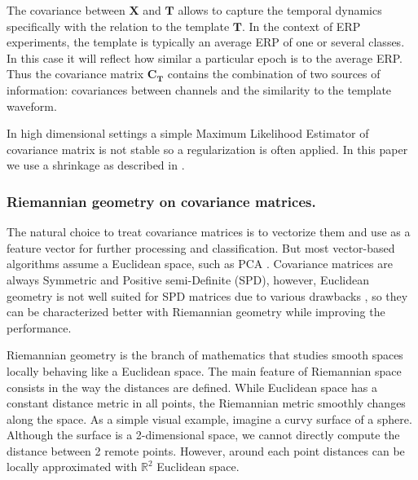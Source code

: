 \documentclass[12pt]{iopart}
\begin{document}
The covariance between $\mathbf{X}$ and $\mathbf{T}$ allows to capture the temporal dynamics
specifically with the relation to the template $\mathbf{T}$. In the context of ERP
experiments, the template is typically an average ERP of one or several classes.
In this case it will reflect how similar a particular epoch is to the average ERP.
Thus the covariance matrix $\mathbf{C}_\mathbf{T}$ contains the combination
of two sources of information: covariances between channels and the similarity to the template waveform.

In high dimensional settings a simple Maximum Likelihood Estimator of covariance matrix is not
stable so a regularization is often applied. In this paper we use
a shrinkage as described in \cite{chen_shrinkage_2010}.

\subsubsection{Riemannian geometry on covariance matrices.}
The natural choice to treat covariance matrices is to vectorize them
and use as a feature vector for further processing and classification.
But most vector-based algorithms assume a Euclidean space, such as PCA \cite{hyvarinen_independent_2001}.
Covariance matrices are always
Symmetric and Positive semi-Definite (SPD), however,
Euclidean geometry is not well suited for SPD matrices due to various
drawbacks \cite{arsigny_geometric_2007}, so they can be characterized 
better with Riemannian geometry while improving the performance.

Riemannian geometry is the branch of mathematics that studies
smooth spaces locally behaving like a Euclidean space.
The main feature of Riemannian space consists in the way the distances are defined.
While Euclidean space has a constant distance metric in all points,
the Riemannian metric smoothly changes along the space.
As a simple visual example, imagine a curvy surface of a sphere.
Although the surface is a 2-dimensional space,
we cannot directly compute the distance between 2 remote points.
However, around each point distances can be locally approximated
with $\mathbb{R}^2$ Euclidean space.
\end{document}
